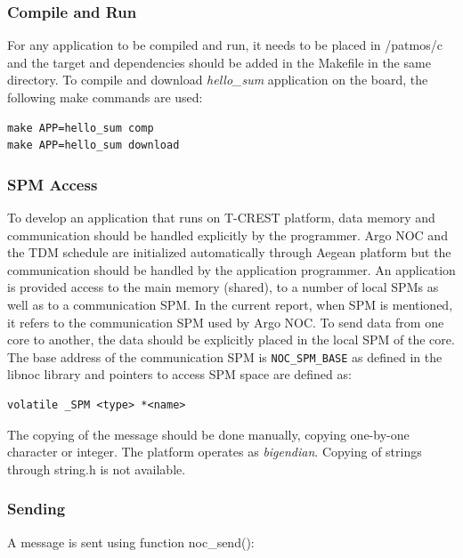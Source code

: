 \documentclass[a4paper,fontsize=10pt,twoside,DIV15,BCOR12mm,headinclude=true,footinclude=false,pagesize,bibtotoc]{scrbook}
\newcommand{\code}[1]{{\texttt{#1}}}
\begin{document}
\subsubsection{Compile and Run}
For any application to be compiled and run, it needs to be placed in /patmos/c and the target and dependencies 
should be added in the Makefile in the same directory.
To compile and download \textit{hello\_sum} application on the board, the following make commands are used:

\begin{verbatim}
make APP=hello_sum comp
make APP=hello_sum download
\end{verbatim}

\subsubsection{SPM Access}
To develop an application that runs on T-CREST platform, data memory and communication should be handled explicitly by the programmer. 
Argo NOC and the TDM schedule are initialized automatically through Aegean platform but the communication should be handled by the application programmer.
An application is provided access to the main memory (shared), to a number of local SPMs as well as to a communication SPM.
In the current report, when SPM is mentioned, it refers to the communication SPM used by Argo NOC.
To send data from one core to another, the data should be explicitly placed in the local SPM of the core.
The base address of the communication SPM is \code{NOC\_SPM\_BASE} as defined in the libnoc library and pointers to access SPM space are defined as:

\begin{lstlisting}
volatile _SPM <type> *<name>
\end{lstlisting}

The copying of the message should be done manually, copying one-by-one character or integer.
The platform operates as \textit{bigendian}.
Copying of strings through string.h is not available. 


\subsubsection{Sending}
A message is sent using function noc\_send():
\end{document}
